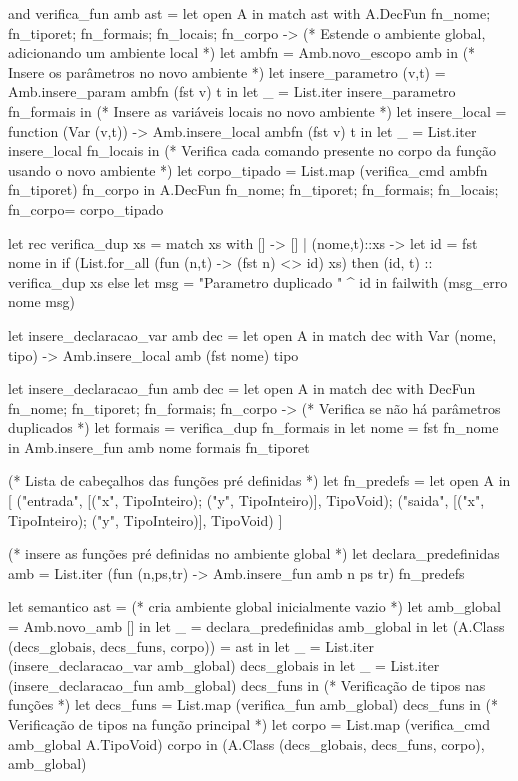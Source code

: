 \documentclass[12pt,a4paper,twoside]{report}
\begin{document}
\begin{terminal}
and verifica_fun amb ast =
  let open A in
  match ast with
    A.DecFun {fn_nome; fn_tiporet; fn_formais; fn_locais; fn_corpo} ->
    (* Estende o ambiente global, adicionando um ambiente local *)
    let ambfn = Amb.novo_escopo amb in
    (* Insere os parâmetros no novo ambiente *)
    let insere_parametro (v,t) = Amb.insere_param ambfn (fst v) t in
    let _ = List.iter insere_parametro fn_formais in
    (* Insere as variáveis locais no novo ambiente *)
    let insere_local = function
        (Var (v,t)) -> Amb.insere_local ambfn (fst v)  t in
    let _ = List.iter insere_local fn_locais in
    (* Verifica cada comando presente no corpo da função usando o novo ambiente *)
    let corpo_tipado = List.map (verifica_cmd ambfn fn_tiporet) fn_corpo in
      A.DecFun {fn_nome; fn_tiporet; fn_formais; fn_locais; fn_corpo= corpo_tipado}


let rec verifica_dup xs =
  match xs with
    [] -> []
  | (nome,t)::xs ->
    let id = fst nome in
    if (List.for_all (fun (n,t) -> (fst n) <> id) xs)
    then (id, t) :: verifica_dup xs
    else let msg = "Parametro duplicado " ^ id in
      failwith (msg_erro nome msg)

let insere_declaracao_var amb dec =
  let open A in
    match dec with
        Var (nome, tipo) ->  Amb.insere_local amb (fst nome) tipo

let insere_declaracao_fun amb dec =
  let open A in
    match dec with
      DecFun {fn_nome; fn_tiporet; fn_formais; fn_corpo} ->
        (* Verifica se não há parâmetros duplicados *)
        let formais = verifica_dup fn_formais in
        let nome = fst fn_nome in
        Amb.insere_fun amb nome formais fn_tiporet


(* Lista de cabeçalhos das funções pré definidas *)
let fn_predefs = let open A in [
   ("entrada", [("x", TipoInteiro); ("y", TipoInteiro)], TipoVoid);
   ("saida",   [("x", TipoInteiro); ("y", TipoInteiro)], TipoVoid)
]

(* insere as funções pré definidas no ambiente global *)
let declara_predefinidas amb =
  List.iter (fun (n,ps,tr) -> Amb.insere_fun amb n ps tr) fn_predefs

let semantico ast =
  (* cria ambiente global inicialmente vazio *)
  let amb_global = Amb.novo_amb [] in
  let _ = declara_predefinidas amb_global in
  let (A.Class (decs_globais, decs_funs, corpo)) = ast in
  let _ = List.iter (insere_declaracao_var amb_global) decs_globais in
  let _ = List.iter (insere_declaracao_fun amb_global) decs_funs in
  (* Verificação de tipos nas funções *)
  let decs_funs = List.map (verifica_fun amb_global) decs_funs in
  (* Verificação de tipos na função principal *)
  let corpo = List.map (verifica_cmd amb_global A.TipoVoid) corpo in
     (A.Class (decs_globais, decs_funs, corpo),  amb_global)
\end{terminal}
\end{document}
